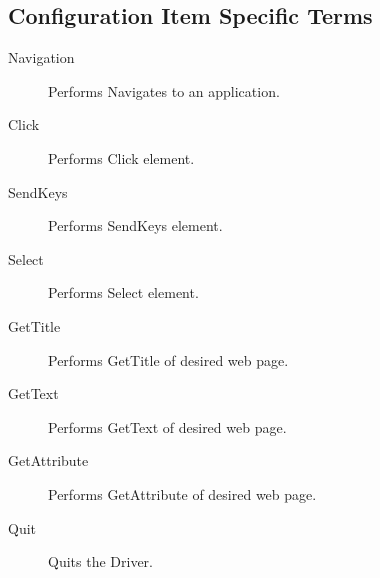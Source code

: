 \subsection{Configuration Item Specific Terms}\label{subsec:configurationitemspecificterms}

\begin{description}

\item[Navigation] \quad Performs Navigates to an application.

\item[Click] \quad Performs Click element.

\item[SendKeys] \quad Performs SendKeys element.

\item[Select] \quad Performs Select element.

\item[GetTitle] \quad Performs GetTitle of desired web page.

\item[GetText] \quad Performs GetText of desired web page.

\item[GetAttribute] \quad Performs GetAttribute of desired web page.

\item[Quit] \quad Quits the Driver.

\end{description}